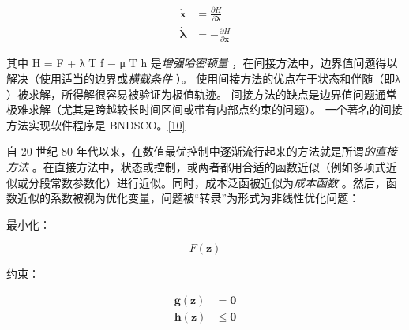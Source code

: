 \[
{\displaystyle {\begin{aligned}{\dot {\textbf {x}}}&={\frac {\partial H}{\partial {\boldsymbol {\lambda }}}}\\[1.2ex]{\dot {\boldsymbol {\lambda }}}&=-{\frac {\partial H}{\partial {\textbf {x}}}}\end{aligned}}}
\]

其中 H = F + λ T f − μ T h 是\emph{增强哈密顿量} ，在间接方法中，边界值问题得以解决（使用适当的边界或\emph{横截条件} ）。 使用间接方法的优点在于状态和伴随（即λ ）被求解，所得解很容易被验证为极值轨迹。 间接方法的缺点是边界值问题通常极难求解（尤其是跨越较长时间区间或带有内部点约束的问题）。 一个著名的间接方法实现软件程序是 BNDSCO。\href{https://en.wikipedia.org/wiki/Optimal_control#cite_note-10}{[10]}

自 20 世纪 80 年代以来，在数值最优控制中逐渐流行起来的方法就是所谓\emph{的直接方法} 。在直接方法中，状态或控制，或两者都用合适的函数近似（例如多项式近似或分段常数参数化）进行近似。同时，成本泛函被近似为\emph{成本函数} 。然后，函数近似的系数被视为优化变量，问题被“转录”为形式为非线性优化问题：

最小化：

\[
{\displaystyle F(\mathbf {z} )}
\]

约束：

\[
{\displaystyle {\begin{aligned}\mathbf {g} (\mathbf {z} )&=\mathbf {0} \\\mathbf {h} (\mathbf {z} )&\leq \mathbf {0} \end{aligned}}}
\]


